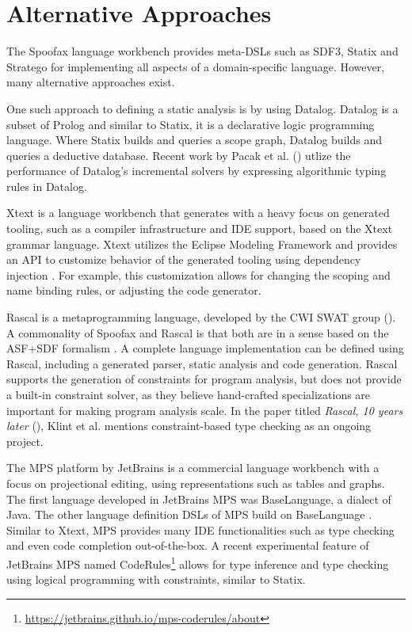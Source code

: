   \section{Alternative Approaches}

    The Spoofax language workbench provides meta-DSLs such as SDF3, Statix and Stratego for implementing all aspects of a domain-specific language. However, many alternative approaches exist.

    One such approach to defining a static analysis is by using Datalog. Datalog is a subset of Prolog and similar to Statix, it is a declarative logic programming language. Where Statix builds and queries a scope graph, Datalog builds and queries a deductive database. Recent work by Pacak et al. (\citeyear{PacakES20}) utlize the performance of Datalog's incremental solvers by expressing algorithmic typing rules in Datalog.

    Xtext \autocite{EfftingeVoelter2006} is a language workbench that generates with a heavy focus on generated tooling, such as a compiler infrastructure and IDE support, based on the Xtext grammar language. Xtext utilizes the Eclipse Modeling Framework \autocite{Steinberg2009EMF} and provides an API to customize behavior of the generated tooling using dependency injection \autocite{eysholdt2010xtext}. For example, this customization allows for changing the scoping and name binding rules, or adjusting the code generator.

    Rascal is a metaprogramming language, developed by the CWI SWAT group (\citeyear{KlintSV09}). A commonality of Spoofax and Rascal is that both are in a sense based on the ASF+SDF formalism \autocite{Klint93}. A complete language implementation can be defined using Rascal, including a generated parser, static analysis and code generation. Rascal supports the generation of constraints for program analysis, but does not provide a built-in constraint solver, as they believe hand-crafted specializations are important for making program analysis scale. In the paper titled \textit{Rascal, 10 years later} (\citeyear{KlintSV19}), Klint et al. mentions constraint-based type checking as an ongoing project.

    The MPS platform by JetBrains \autocite{Dmitriev2004LanguageOP} is a commercial language workbench with a focus on projectional editing, using representations such as tables and graphs. The first language developed in JetBrains MPS was BaseLanguage, a dialect of Java. The other language definition DSLs of MPS build on BaseLanguage \autocite{PechSV13}. Similar to Xtext, MPS provides many IDE functionalities such as type checking and even code completion out-of-the-box. A recent experimental feature of JetBrains MPS named CodeRules\footnote{\url{https://jetbrains.github.io/mps-coderules/about}} allows for type inference and type checking using logical programming with constraints, similar to Statix.

